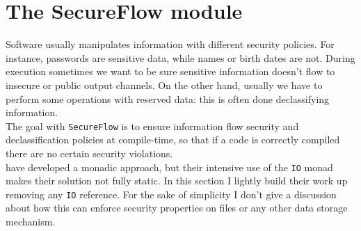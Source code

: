 \section{The SecureFlow module}\label{sec:flow}
Software usually manipulates information with different security policies. For instance, passwords are sensitive data, while names or birth dates are not. During execution sometimes we want to be sure sensitive information doesn't flow to insecure or public output channels. On the other hand, usually we have to perform some operations with reserved data: this is often done declassifying information. \\
The goal with \texttt{SecureFlow} is to ensure information flow security and declassification policies at compile-time, so that if a code is correctly compiled there are no certain security violations. \\
\citeauthor{russo2008library} \cite{russo2008library} have developed a monadic approach, but their intensive use of the \texttt{IO} monad makes their solution not fully static. In this section I lightly build their work up removing any \texttt{IO} reference. For the sake of simplicity I don't give a discussion about how this can enforce security properties on files or any other data storage mechanism.

